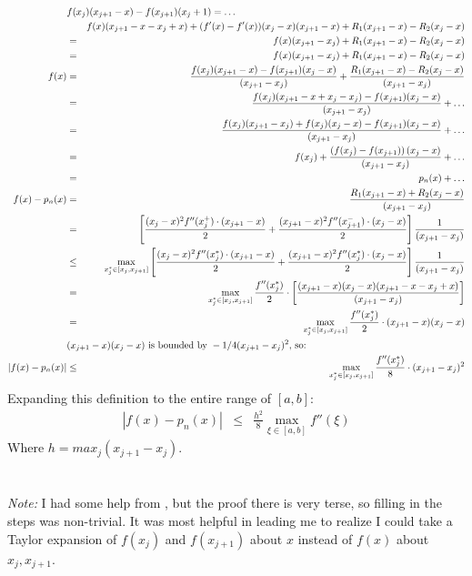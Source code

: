 \documentclass{article}
\newcommand{\ea}[1]{\begin{eqnarray*}#1\end{eqnarray*}}
\begin{document}
\ea{
\lefteqn{f(x_j)(x_{j+1}-x) - f(x_{j+1})(x_j+1) = \dots}  \\ 
&&	f(x)(x_{j+1}-x-x_j+x) + (f'(x)-f'(x))(x_j-x)(x_{j+1}-x)+ R_1(x_{j+1}-x) - R_2(x_j-x) \\
&=& f(x)(x_{j+1}-x_j) + R_1(x_{j+1}-x) - R_2(x_j-x) \\
&=& f(x)(x_{j+1}-x_j) + R_1(x_{j+1}-x) - R_2(x_j-x) \\
f(x) &=&  \frac{ f(x_j)(x_{j+1}-x) - f(x_{j+1})(x_j-x) }{(x_{j+1}-x_j)} + \frac{R_1(x_{j+1}-x) - R_2(x_j-x)}{(x_{j+1}-x_j)} \\
&=& \frac{ f(x_j)(x_{j+1}-x+x_j-x_j) - f(x_{j+1})(x_j-x) }{(x_{j+1}-x_j)} + \dots\\
&=& \frac{ f(x_j)(x_{j+1}-x_j) + f(x_j)(x_j-x) - f(x_{j+1})(x_j-x) }{(x_{j+1}-x_j)} + \dots\\
&=& f(x_j) + \frac{ \left(f(x_j) - f(x_{j+1}) \right)(x_j-x) }{(x_{j+1}-x_j)} + \dots\\
&=& p_n(x) + \dots \\
f(x)-p_n(x) &=& \frac{R_1(x_{j+1}- x) + R_2(x_j-x)}{(x_{j+1}-x_j)} \\ 
&=& \left[\frac{ (x_j-x)^2 f''(x_j^+) \cdot(x_{j+1}-x) }{2} + \frac{ (x_{j+1}-x)^2 f''(x_{j+1}^{-}) \cdot(x_j-x)}{2}\right]\frac{1}{( x_{j+1}-x_j)} \\
&\le& \max_{x_j^*\in[x_j,x_{j+1}]}\left[\frac{ (x_j-x)^2 f''(x_j^*)\cdot(x_{j+1}-x)}{2} + \frac{ (x_{j+1}-x)^2 f''(x_{j}^*)\cdot(x_j-x)}{2}\right]\frac{1}{( x_{j+1}-x_j)} \\ 
&=& \max_{x_j^*\in[x_j,x_{j+1}]}\frac{ f''(x_j^*)}{2} \cdot 
\left[\frac{(x_{j+1}-x)(x_j-x)(x_{j+1}-x-x_j+x)}{( x_{j+1}-x_j)}\right] \\
&=&  \max_{x_j^*\in[x_j,x_{j+1}]}\frac{ f''(x_j^*)}{2} \cdot (x_{j+1}-x)(x_j-x) \\
\lefteqn{(x_{j+1}-x)(x_j-x) \textrm{ is bounded by } - 1/4(x_{j+1}-x_j)^2\textrm{, so:}}\\
|f(x)-p_n(x)| &\le& \max_{x_j^*\in[x_j,x_{j+1}]}\frac{ f''(x_j^*)}{8} \cdot (x_{j+1}-x_j)^2 
}
Expanding this definition to the entire range of $[a,b]$:
\ea{
	|f(x)-p_n(x)| &\le& \frac{h^2}{8} \max_{\xi\in[a,b]}f''(\xi)
}
Where $h=max_j(x_{j+1}-x_j)$.\\
\\
\\
\textit{Note:} I had some help from \cite{195501}, but the proof there is very terse, so filling in the steps was non-trivial.  It was most helpful in leading me to realize I 
could take a Taylor expansion of $f(x_j)$ and $f(x_{j+1})$ about $x$ instead of $f(x)$ about $x_j,x_{j+1}$.
\\

\end{document}
